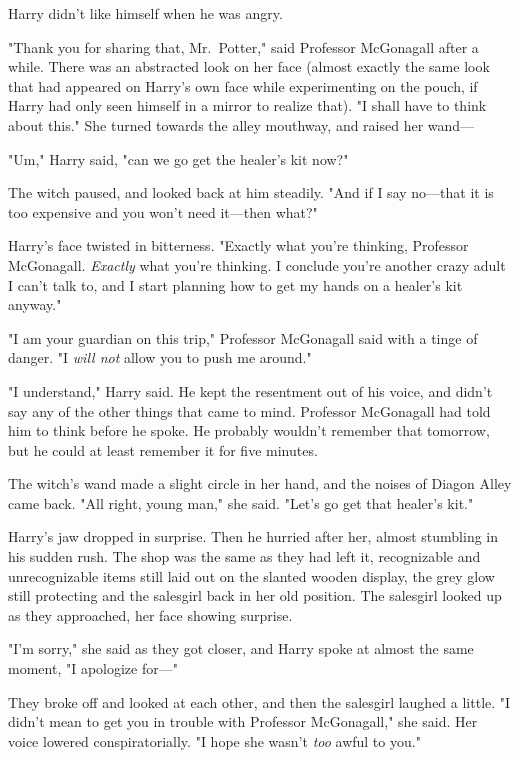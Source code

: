 Harry didn't like himself when he was angry.

"Thank you for sharing that, Mr.~Potter," said Professor McGonagall after a
while. There was an abstracted look on her face (almost exactly the same look
that had appeared on Harry's own face while experimenting on the pouch, if
Harry had only seen himself in a mirror to realize that). "I shall have to
think about this." She turned towards the alley mouthway, and raised her wand—

"Um," Harry said, "can we go get the healer's kit now?"

The witch paused, and looked back at him steadily. "And if I say no—that it
is too expensive and you won't need it—then what?"

Harry's face twisted in bitterness. "Exactly what you're thinking, Professor
McGonagall. \emph{Exactly} what you're thinking. I conclude you're another
crazy adult I can't talk to, and I start planning how to get my hands on a
healer's kit anyway."

"I am your guardian on this trip," Professor McGonagall said with a tinge of
danger. "I \emph{will not} allow you to push me around."

"I understand," Harry said. He kept the resentment out of his voice, and didn't
say any of the other things that came to mind. Professor McGonagall had told
him to think before he spoke. He probably wouldn't remember that tomorrow, but
he could at least remember it for five minutes.

The witch's wand made a slight circle in her hand, and the noises of Diagon
Alley came back. "All right, young man," she said. "Let's go get that healer's
kit."

Harry's jaw dropped in surprise. Then he hurried after her, almost stumbling in
his sudden rush.
\sbreak
The shop was the same as they had left it, recognizable and unrecognizable
items still laid out on the slanted wooden display, the grey glow still
protecting and the salesgirl back in her old position. The salesgirl looked up
as they approached, her face showing surprise.

"I'm sorry," she said as they got closer, and Harry spoke at almost the same
moment, "I apologize for—"

They broke off and looked at each other, and then the salesgirl laughed a
little. "I didn't mean to get you in trouble with Professor McGonagall," she
said. Her voice lowered conspiratorially. "I hope she wasn't \emph{too} awful
to you."


